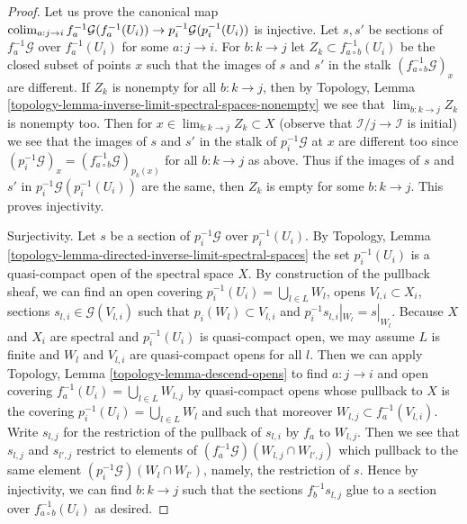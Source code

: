 \begin{proof}
Let us prove the canonical map
$\mathop{\mathrm{colim}}\nolimits_{a : j \to i} f_a^{-1}\mathcal{G}(f_a^{-1}(U_i)) \to
p_i^{-1}\mathcal{G}(p_i^{-1}(U_i))$ is injective.
Let $s, s'$ be sections of $f_a^{-1}\mathcal{G}$
over $f_a^{-1}(U_i)$ for some $a : j \to i$. For
$b : k \to j$ let $Z_k \subset f_{a \circ b}^{-1}(U_i)$
be the closed subset of points $x$ such that the images of
$s$ and $s'$ in the stalk $(f_{a \circ b}^{-1}\mathcal{G})_x$
are different. If $Z_k$ is nonempty for all $b : k \to j$, then by
Topology, Lemma \ref{topology-lemma-inverse-limit-spectral-spaces-nonempty}
we see that $\lim_{b : k \to j} Z_k$ is nonempty too.
Then for $x \in \lim_{b : k \to j} Z_k \subset X$
(observe that $\mathcal{I}/j \to \mathcal{I}$ is initial)
we see that the images of $s$ and $s'$ in the stalk of
$p_i^{-1}\mathcal{G}$ at $x$ are different too since
$(p_i^{-1}\mathcal{G})_x = (f_{a \circ b}^{-1}\mathcal{G})_{p_k(x)}$
for all $b : k \to j$ as above. Thus if the images of $s$ and $s'$
in $p_i^{-1}\mathcal{G}(p_i^{-1}(U_i))$ are the same, then $Z_k$
is empty for some $b : k \to j$. This proves injectivity.

\medskip\noindent
Surjectivity. Let $s$ be a section of $p_i^{-1}\mathcal{G}$ over
$p_i^{-1}(U_i)$. By
Topology, Lemma \ref{topology-lemma-directed-inverse-limit-spectral-spaces}
the set $p_i^{-1}(U_i)$ is a quasi-compact open of the spectral space $X$.
By construction of the pullback sheaf, we can find an open covering
$p_i^{-1}(U_i) = \bigcup_{l \in L} W_l$,
opens $V_{l, i} \subset X_i$,
sections $s_{l, i} \in \mathcal{G}(V_{l, i})$
such that $p_i(W_l) \subset V_{l, i}$ and $p_i^{-1}s_{l, i}|_{W_l} = s|_{W_l}$.
Because $X$ and $X_i$ are spectral and $p_i^{-1}(U_i)$ is quasi-compact open,
we may assume $L$ is finite and $W_l$ and $V_{l, i}$ are quasi-compact opens
for all $l$. Then we can apply
Topology, Lemma \ref{topology-lemma-descend-opens}
to find $a : j \to i$ and open covering
$f_a^{-1}(U_i) = \bigcup_{l \in L} W_{l, j}$ by quasi-compact
opens whose pullback to $X$ is the covering
$p_i^{-1}(U_i) = \bigcup_{l \in L} W_l$
and such that moreover $W_{l, j} \subset f_a^{-1}(V_{l, i})$.
Write $s_{l, j}$ for the restriction of the pullback of $s_{l, i}$
by $f_a$ to $W_{l, j}$. Then we see that $s_{l, j}$ and $s_{l', j}$
restrict to elements of $(f_a^{-1}\mathcal{G})(W_{l, j} \cap W_{l', j})$
which pullback to the same element $(p_i^{-1}\mathcal{G})(W_l \cap W_{l'})$,
namely, the restriction of $s$. Hence by injectivity, we can find
$b : k \to j$ such that the sections $f_b^{-1}s_{l, j}$
glue to a section over $f_{a \circ b}^{-1}(U_i)$ as desired.
\end{proof}

